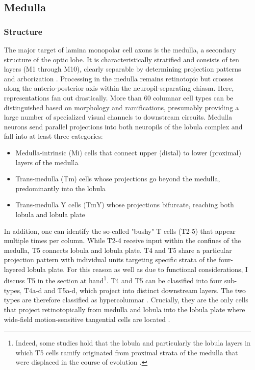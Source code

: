 \subsection{Medulla}

\subsubsection{Structure}
The major target of lamina monopolar cell axons is the medulla, a secondary structure of the optic lobe. It is characteristically stratified and consists of ten layers (M1 through M10), clearly separable by determining projection patterns and arborization \citep{Fischbach:1989uw}. Processing in the medulla remains retinotopic but crosses along the anterio-posterior axis within the neuropil-separating chiasm. Here, representations fan out drastically. More than 60 columnar cell types can be distinguished based on morphology and ramifications, presumably providing a large number of specialized visual channels to downstream circuits. Medulla neurons send parallel projections into both neuropils of the lobula complex and fall into at least three categories:

\begin{itemize}
    \item Medulla-intrinsic (Mi) cells that connect upper (distal) to lower (proximal) layers of the medulla
    \item Trans-medulla (Tm) cells whose projections go beyond the medulla, predominantly into the lobula
    \item Trans-medulla Y cells (TmY) whose projections bifurcate, reaching both lobula and lobula plate
\end{itemize}

In addition, one can identify the so-called "bushy" T cells (T2-5) that appear multiple times per column. While T2-4 receive input within the confines of the medulla, T5 connects lobula and lobula plate. T4 and T5 share a particular projection pattern with individual units targeting specific strata of the four-layered lobula plate. For this reason as well as due to functional considerations, I discuss T5 in the section at hand\footnote{Indeed, some studies hold that the lobula and particularly the lobula layers in which T5 cells ramify originated from proximal strata of the medulla that were displaced in the course of evolution \citep{Douglass:1996aa,Shinomiya:2015aa}.}. T4 and T5 can be classified into four sub-types, T4a-d and T5a-d, which project into distinct downstream layers. The two types are therefore classified as hypercolumnar \citep{Bausenwein:1992vx}. Crucially, they are the only cells that project retinotopically from medulla and lobula into the lobula plate where wide-field motion-sensitive tangential cells are located \citep{Fischbach:1989uw,Douglass:1996aa}.

